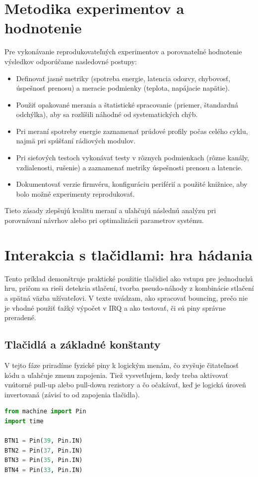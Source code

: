\clearpage
\section{Metodika experimentov a hodnotenie}

Pre vykonávanie reprodukovateľných experimentov a porovnateľné hodnotenie výsledkov odporúčame nasledovné postupy:
\begin{itemize}
	\item Definovať jasné metriky (spotreba energie, latencia odozvy, chybovosť, úspešnosť prenosu) a meracie podmienky (teplota, napájacie napätie).
	\item Použiť opakované merania a štatistické spracovanie (priemer, štandardná odchýlka), aby sa rozlíšili náhodné od systematických chýb.
	\item Pri meraní spotreby energie zaznamenať prúdové profily počas celého cyklu, najmä pri spúšťaní rádiových modulov.
	\item Pri sieťových testoch vykonávať testy v rôznych podmienkach (rôzne kanály, vzdialenosti, rušenie) a zaznamenať metriky úspešnosti prenosu a latencie.
	\item Dokumentovať verzie firmvéru, konfiguráciu periférií a použité knižnice, aby bolo možné experimenty reprodukovať.
\end{itemize}

Tieto zásady zlepšujú kvalitu meraní a uľahčujú následnú analýzu pri porovnávaní návrhov alebo pri optimalizácii parametrov systému.

\section{Interakcia s tlačidlami: hra hádania}
Tento príklad demonštruje praktické použitie tlačidiel ako vstupu pre jednoduchú hru, pričom sa rieši detekcia stlačení, tvorba pseudo-náhody z kombinácie stlačení a spätná väzba užívateľovi. V texte uvádzam, ako spracovať bouncing, prečo nie je vhodné použiť ťažký výpočet v IRQ a ako testovať, či sú piny správne preradené.

\subsection*{Tlačidlá a základné konštanty}
V tejto fáze priradíme fyzické piny k logickým menám, čo zvyšuje čitateľnosť kódu a uľahčuje zmenu zapojenia. Tiež vysvetľujem, kedy treba aktivovať vnútorné pull-up alebo pull-down rezistory a čo očakávať, keď je logická úroveň invertovaná (závisí to od zapojenia tlačidla).
\begin{lstlisting}[language=Python]
from machine import Pin
import time

BTN1 = Pin(39, Pin.IN)
BTN2 = Pin(37, Pin.IN)
BTN3 = Pin(35, Pin.IN)
BTN4 = Pin(33, Pin.IN)
\end{lstlisting}

